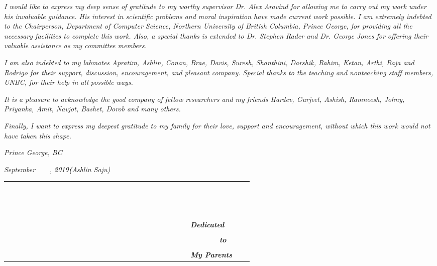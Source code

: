 \documentclass[a4paper,12pt,titlepage,oneside]{report}
\begin{document}
{\large
\emph{I would like to express my deep sense of gratitude to my worthy supervisor Dr. Alex Aravind for allowing me to carry out my work under his invaluable guidance. His interest in scientific problems and moral inspiration have made current work possible. I am extremely indebted to the Chairperson, Department of Computer Science, Northern University of British Columbia, Prince George, for providing all the necessary facilities to complete this work. Also, a special thanks is extended to Dr. Stephen Rader and Dr. George Jones for offering their valuable assistance as my committee members.}

\emph{I am also indebted to my labmates Apratim, Ashlin, Conan, Brae, Davis, Suresh, Shanthini, Darshik, Rahim, Ketan, Arthi, Raja and Rodrigo for their support, discussion, encouragement, and pleasant company. Special thanks to the teaching and nonteaching staff members, UNBC, for their help in all possible ways.}
\par
\emph{It is a pleasure to acknowledge the good company of fellow researchers and my friends Hardev, Gurjeet, Ashish, Ramneesh, Johny, Priyanka, Amit, Navjot, Bashet, Dorob and many others.}

\emph{Finally, I want to express my deepest gratitude to my family for their love, support and encouragement, without which this work would not have taken this shape.}

\vspace{1.0cm}
\emph{Prince George, BC}

\emph{September~~~~, 2019\hfill\textbf(Ashlin Saju)}



\newpage
\thispagestyle{empty}
\begin{tabular}{p{4in}cr}
	 &  &                                                                          \\&&\\&&\\&&\\&&\\&&\\&&\\&&\\&&\\&&\\&&\\&&\\&&\\&&\\
	\emph{\textbf{\large{~~~~~~~~~~~~~~~~~~~~~~~~~~~~~~~~~~~~~~~~~~~~Dedicated}}}  \\&&\\ \emph{\textbf{\large{~~~~~~~~~~~~~~~~~~~~~~~~~~~~~~~~~~~~~~~~~~~~~~~~~~~to}}}\\&&\\
	\emph{\textbf{\large{~~~~~~~~~~~~~~~~~~~~~~~~~~~~~~~~~~~~~~~~~~~~My Parents}}} \\
\end{tabular}

}
\end{document}
